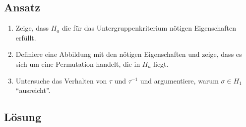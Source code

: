 \subsection{Ansatz}
\begin{enumerate}
	\item Zeige, dass \( H_a \) die für das Untergruppenkriterium nötigen Eigenschaften erfüllt.
	\item Definiere eine Abbildung mit den nötigen Eigenschaften und zeige, dass es sich um eine Permutation handelt, die in \( H_a \) liegt.
	\item Untersuche das Verhalten von \( \tau \) und \( \tau^{-1} \) und argumentiere, warum \( \sigma \in H_1 \) ``ausreicht''.
\end{enumerate}

\subsection{Lösung}
